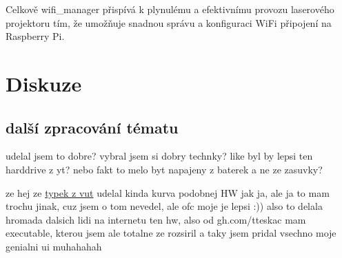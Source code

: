 \documentclass{template/socthesis}
\begin{document}
Celkově wifi\_manager přispívá k plynulému a efektivnímu provozu laserového projektoru tím, že umožňuje snadnou správu a konfiguraci WiFi připojení na Raspberry Pi.

\chapter{Diskuze}
\section{další zpracování tématu}
udelal jsem to dobre? vybral jsem si dobry technky?
like byl by lepsi ten harddrive z yt?
nebo fakt to melo byt napajeny z baterek a ne ze zasuvky?

ze hej ze \href{https://dspace.vutbr.cz/bitstream/handle/11012/38621/final-thesis.pdf?sequence=-1}{typek z vut} udelal kinda kurva podobnej HW jak ja, ale ja to mam trochu jinak, cuz jsem o tom nevedel, ale ofc moje je lepsi :))
also to delala hromada dalsich lidi na internetu ten hw, also od gh.com/tteskac mam executable, kterou jsem ale totalne ze rozsiril a taky jsem pridal vsechno moje genialni ui muhahahah
\end{document}

